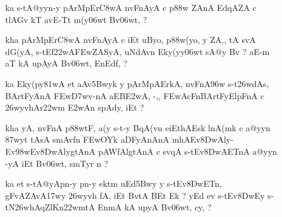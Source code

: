 \def\DevnagVersion{2.15}\documentclass{article}
\begin{document}
\begin{itemize}
\begin{itemize}
                \item[\dn ~na] {\dn gEZt>yoEtqAdy, s\2-tEv\38DwAfAKA, aAEnkEv\3E2wAnEv\38DwAEnkAy\? -v\2 -v uEct\2 pd\2 lB\?r i(y\?tdT\?{\qvb} k\? upAyA, BvE<d, Qy\306wt\? {\rs ?\re}}
               \end{itemize} 
               
  \item[\dn 20] \begin{itemize}
             
             \item[\dn ka] {\dn s\2-tA@yyn-y pArMpEr\3C8wA\2 nvFnAyA\2 c p\388w ZAnA\2 EdqAZA\2 c t\0lAGv\2 kT avE-Tt\2 m(y\306wt\? Bv\306wt, {\rs ?\re}}
             
             \item[\dn kha] {\dn pArMpEr\3C8wA\2 nvFnAyA\2 c iEt uByo, p\388w(yo, y\? ZA,{\rs ,\re} tA svA\0 dG(yA, s\2-tEf\322wA\3FEwZASyA, uNdAvn\2 Eky(yy\0\306wt\2 sA@y\2 Bv\? {\rs ?\re} aE-m aT\?{\qvb} kA upAyA Bv\306wt, EnEd\0f\?, {\rs ?\re}}
             \end{itemize} 
             
             
 \item[\dn 21]  \begin{itemize}
                
                \item[\dn ka] {\dn Eky(py\0\381wA et aAv\35Bwyk\2 y pArMpAErkA, nvFnA\396w s\2-t\326wdA\2s, BArtFyAnA\2 \3FEw\3D7wv-nA aEB\3E2wA, -,{\rs ,\re} \3FEwAcFnBArtFyElpFnA\2 c \326wyvhAr\322wm\2 \3E2wAn\2 s\2pAdy\?, iEt {\rs ?\re}}
                
                \item[\dn kha] {\dn yA, nvFnA\2 p\388wtF, a(y s\2-t-y BqA(v\?n eiEthAEsk\2 lnA(mk\2 c a@yyn\2 \387w\4yt\?{\rs ,\re} tAsA\2 smAv\?fn\2 \3FEwOYk aDFyAnAnA\2 mhAEv\38DwAly{\rs -\re}Ev\398wEv\38DwAlygtAnA\2 pAWfAlgtAnA\2 c sv\?{\qvb}qA\2 s\2-tEv\38DwAET\0nA a@yyn\? -yA iEt Bv\306wt, smT\0y\?r n {\rs ?\re}}
                \end{itemize}          
  
 \item[\dn 22] \begin{itemize}
               
               \item[\dn ka] {\dn et s\2-tA@yApn-y pn-y ektm uEd\35Bwy y s\2-tEv\38DwET\0n, gFvA\0ZAvA\317wy\2 \326wyvh fA, iEt BvtA\2 BEt Ek {\rs ?\re} yEd ev s\2-tEv\38DwEy\0 s\2-tN\326whAqZl\?Kn\322wmtA\2 EnmA\0\2 kA upyA Bv\306wt, cy\?, {\rs ?\re}}
               

\end{itemize}
\end{itemize}
\end{document}
